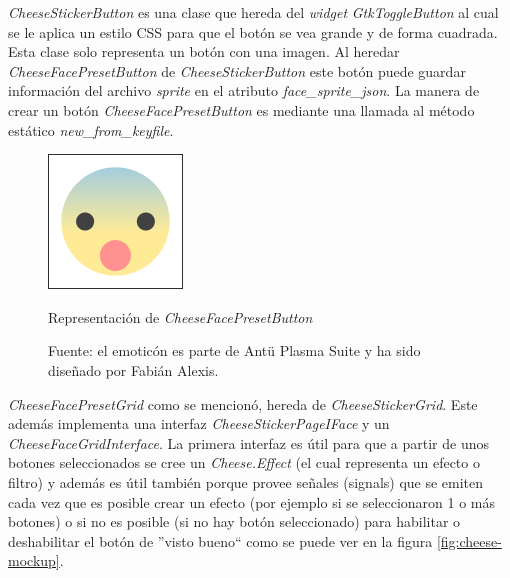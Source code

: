 \documentclass[a4paper,openright,12pt]{report}
\begin{document}
\textit{CheeseStickerButton} es una clase que hereda del \textit{widget}
\textit{\gls{GtkToggleButton}} al cual se le aplica un estilo CSS para que el botón
se vea grande y de forma cuadrada. Esta clase solo representa un botón con una
imagen. Al heredar \textit{CheeseFacePresetButton} de
\textit{CheeseStickerButton} este botón puede guardar información del archivo
\textit{sprite} en el atributo \textit{face\_sprite\_json}. La manera de crear
un botón \textit{CheeseFacePresetButton} es mediante una llamada al método
estático \textit{new\_from\_keyfile}.\\

\begin{figure}[!h]
  \centering
    \includegraphics{../images/cheese-mockup-face-preset-button.png}\par
  \caption{Representación de \textit{{CheeseFacePresetButton}}}
    \label{fig:cheese-sticker-button}
  \caption*{Fuente: el emoticón es parte de Antü Plasma Suite y ha sido
    diseñado por Fabián Alexis.}
\end{figure}

\textit{CheeseFacePresetGrid} como se mencionó, hereda de
\textit{CheeseStickerGrid}. Este además implementa una interfaz
\textit{CheeseStickerPageIFace} y un \textit{CheeseFaceGridInterface}. La
primera interfaz es útil para que a partir de unos botones seleccionados se
cree un \textit{Cheese.Effect} (el cual representa un efecto o filtro) y además
es útil también porque provee señales (\gls{signals}) que se emiten cada vez
que es posible crear un efecto (por ejemplo si se seleccionaron 1 o más botones)
o si no es posible (si no hay botón seleccionado) para habilitar o deshabilitar
el botón de ''visto bueno`` como se puede ver en la figura
\ref{fig:cheese-mockup}.\\
\end{document}
